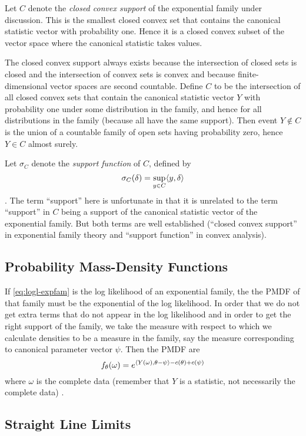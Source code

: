Let $C$ denote the \emph{closed convex support} of the exponential family
under discussion.  This is the smallest closed convex set that contains
the canonical statistic vector with probability one.  Hence it is a closed
convex subset of the vector space where the canonical statistic takes values.

The closed convex support always exists because the intersection of closed sets
is closed and the intersection of convex sets is convex and because
finite-dimensional vector spaces are second countable.  Define $C$ to be
the intersection of all closed convex sets that contain the canonical
statistic vector $Y$ with probability one under some distribution in the
family, and hence for all distributions in the family (because all have
the same support).  Then event $Y \notin C$ is the
union of a countable family of open sets having probability zero,
hence $Y \in C$ almost surely.

Let $\sigma_C$ denote the \emph{support function} of $C$, defined by
$$
   \sigma_C(\delta) = \sup_{y \in C} \langle y, \delta \rangle
$$
\citep[Section~8.E]{rockafellar-wets}.  The term ``support'' here is
unfortunate in that it is unrelated to the term ``support'' in $C$ being
a support of the canonical statistic vector of the exponential family.
But both terms are well established (``closed convex support'' in exponential
family theory and ``support function'' in convex analysis).

\subsection{Probability Mass-Density Functions}

If \eqref{eq:logl-expfam} is the log likelihood of an exponential family,
the the PMDF of that family must be the exponential of the log likelihood.
In order that we do not get extra terms that do not appear in the log
likelihood and in order to get the right support of the family, we take
the measure with respect to which we calculate densities to be a measure
in the family, say the measure corresponding to canonical parameter vector
$\psi$.  Then the PMDF are
\begin{equation} \label{eq:pmdf-expfam}
   f_\theta(\omega) = e^{\langle Y(\omega), \theta - \psi \rangle - c(\theta) + c(\psi)}
\end{equation}
where $\omega$ is the complete data (remember that $Y$ is a statistic,
not necessarily the complete data) \citep[Equation~(4)]{geyer-gdor}.

\subsection{Straight Line Limits}

